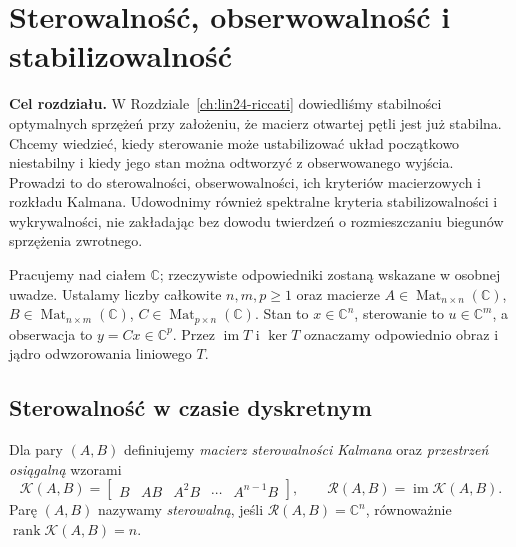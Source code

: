 \chapter{Sterowalność, obserwowalność i stabilizowalność}
\label{ch:lin25-control}

\noindent\textbf{Cel rozdziału.}
W Rozdziale~\ref{ch:lin24-riccati}
dowiedliśmy stabilności optymalnych sprzężeń
przy założeniu, że macierz otwartej pętli
jest już stabilna. Chcemy wiedzieć,
kiedy sterowanie może ustabilizować
układ początkowo niestabilny
i kiedy jego stan można odtworzyć
z obserwowanego wyjścia.
Prowadzi to do sterowalności,
obserwowalności, ich kryteriów
macierzowych i rozkładu Kalmana.
Udowodnimy również spektralne
kryteria stabilizowalności
i wykrywalności, nie zakładając
bez dowodu twierdzeń o rozmieszczaniu
biegunów sprzężenia zwrotnego.

Pracujemy nad ciałem \(\mathbb C\);
rzeczywiste odpowiedniki zostaną
wskazane w osobnej uwadze.
Ustalamy liczby całkowite
\(n,m,p\ge1\) oraz macierze
\(A\in\operatorname{Mat}_{n\times n}(\mathbb C)\),
\(B\in\operatorname{Mat}_{n\times m}(\mathbb C)\),
\(C\in\operatorname{Mat}_{p\times n}(\mathbb C)\).
Stan to \(x\in\mathbb C^n\),
sterowanie to \(u\in\mathbb C^m\),
a obserwacja to \(y=Cx\in\mathbb C^p\).
Przez \(\operatorname{im}T\)
i \(\ker T\) oznaczamy odpowiednio
obraz i jądro odwzorowania liniowego \(T\).

\section{Sterowalność w czasie dyskretnym}
\label{sec:lin25-reach}

\begin{definicja}
\label{def:lin25-kalman}
Dla pary \((A,B)\) definiujemy
\emph{macierz sterowalności Kalmana}
oraz \emph{przestrzeń osiągalną}
wzorami
\[
 \mathcal K(A,B)=
 \begin{bmatrix}
 B&AB&A^2B&\cdots&A^{n-1}B
 \end{bmatrix},
 \qquad
 \mathcal R(A,B)=\operatorname{im}\mathcal K(A,B).
\]
Parę \((A,B)\) nazywamy
\emph{sterowalną}, jeśli
\(\mathcal R(A,B)=\mathbb C^n\),
równoważnie
\(\operatorname{rank}\mathcal K(A,B)=n\).
\end{definicja}

